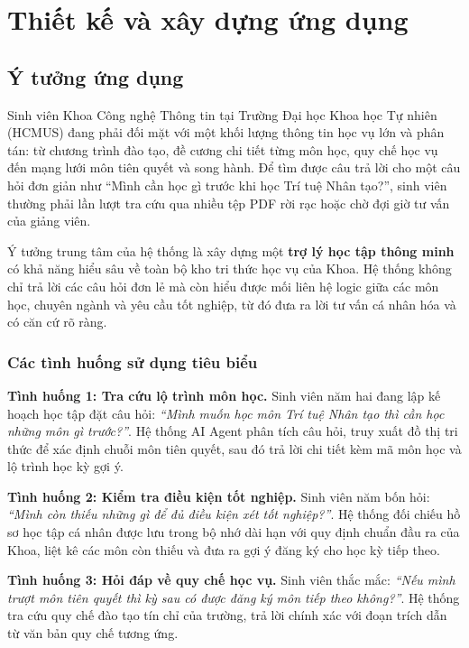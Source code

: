 \chapter{Thiết kế và xây dựng ứng dụng}
\label{Chapter4-ThietKe}

\section{Ý tưởng ứng dụng}

Sinh viên Khoa Công nghệ Thông tin tại Trường Đại học Khoa học Tự nhiên (HCMUS) đang phải đối mặt với một khối lượng thông tin học vụ lớn và phân tán: từ chương trình đào tạo, đề cương chi tiết từng môn học, quy chế học vụ đến mạng lưới môn tiên quyết và song hành. Để tìm được câu trả lời cho một câu hỏi đơn giản như ``Mình cần học gì trước khi học Trí tuệ Nhân tạo?'', sinh viên thường phải lần lượt tra cứu qua nhiều tệp PDF rời rạc hoặc chờ đợi giờ tư vấn của giảng viên.

Ý tưởng trung tâm của hệ thống là xây dựng một \textbf{trợ lý học tập thông minh} có khả năng hiểu sâu về toàn bộ kho tri thức học vụ của Khoa. Hệ thống không chỉ trả lời các câu hỏi đơn lẻ mà còn hiểu được mối liên hệ logic giữa các môn học, chuyên ngành và yêu cầu tốt nghiệp, từ đó đưa ra lời tư vấn cá nhân hóa và có căn cứ rõ ràng.

\subsection{Các tình huống sử dụng tiêu biểu}

\textbf{Tình huống 1: Tra cứu lộ trình môn học.}
Sinh viên năm hai đang lập kế hoạch học tập đặt câu hỏi: \textit{``Mình muốn học môn Trí tuệ Nhân tạo thì cần học những môn gì trước?''}. Hệ thống AI Agent phân tích câu hỏi, truy xuất đồ thị tri thức để xác định chuỗi môn tiên quyết, sau đó trả lời chi tiết kèm mã môn học và lộ trình học kỳ gợi ý.

\textbf{Tình huống 2: Kiểm tra điều kiện tốt nghiệp.}
Sinh viên năm bốn hỏi: \textit{``Mình còn thiếu những gì để đủ điều kiện xét tốt nghiệp?''}. Hệ thống đối chiếu hồ sơ học tập cá nhân được lưu trong bộ nhớ dài hạn với quy định chuẩn đầu ra của Khoa, liệt kê các môn còn thiếu và đưa ra gợi ý đăng ký cho học kỳ tiếp theo.

\textbf{Tình huống 3: Hỏi đáp về quy chế học vụ.}
Sinh viên thắc mắc: \textit{``Nếu mình trượt môn tiên quyết thì kỳ sau có được đăng ký môn tiếp theo không?''}. Hệ thống tra cứu quy chế đào tạo tín chỉ của trường, trả lời chính xác với đoạn trích dẫn từ văn bản quy chế tương ứng.

